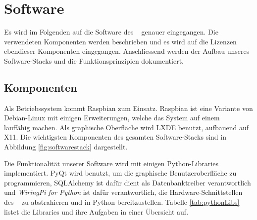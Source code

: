 \section{Software \Master}
\label{sec:software:master}

Es wird  im Folgenden auf  die Software des \Master~  genauer eingegangen. Die
verwendeten  Komponenten  werden beschrieben  und  es  wird auf  die  Lizenzen
ebendieser  Komponenten eingegangen. Anschliessend  werden der  Aufbau unseres
Software-Stacks und die Funktionsprinzipien dokumentiert.


\subsection{Komponenten}
\label{subsec:software:master:components}

Als Betriebssystem kommt Raspbian zum  Einsatz. Raspbian ist eine Variante von
Debian-Linux mit  einigen Erweiterungen, welche  das System auf  einem \Raspi~
lauff\"ahig machen. Als  graphische Oberfl\"ache wird LXDE  benutzt, aufbauend
auf  X11. Die wichtigsten  Komponenten  des gesamten  Software-Stacks sind  in
Abbildung \ref{fig:softwarestack} dargestellt.

Die  Funktionalit\"at  unserer  Software  wird  mit  einigen  Python-Libraries
implementiert. PyQt  wird  benutzt,  um  die  graphische  Benutzeroberfl\"ache
zu   programmieren,  SQLAlchemy   ist  daf\"ur   dient  als   Datenbanktreiber
verantwortlich  und \emph{WiringPi  for  Python}  ist daf\"ur  verantwortlich,
die  Hardware-Schnittstellen  des  \Raspi~   zu  abstrahieren  und  in  Python
bereitzustellen. Tabelle  \ref{tab:pythonLibs} listet  die Libraries  und ihre
Aufgaben in einer \"Ubersicht auf.

